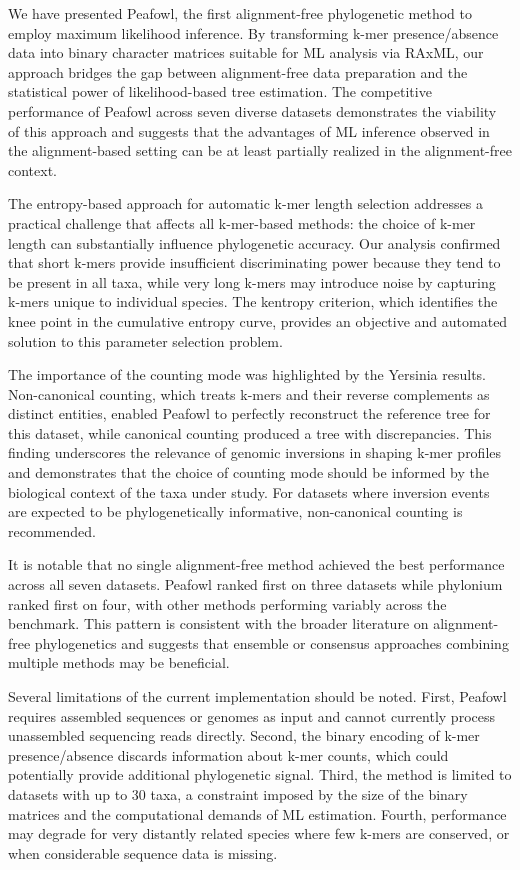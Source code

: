 \documentclass[12pt]{article}
\begin{document}
We have presented Peafowl, the first alignment-free phylogenetic method to employ maximum likelihood inference. By transforming k-mer presence/absence data into binary character matrices suitable for ML analysis via RAxML, our approach bridges the gap between alignment-free data preparation and the statistical power of likelihood-based tree estimation. The competitive performance of Peafowl across seven diverse datasets demonstrates the viability of this approach and suggests that the advantages of ML inference observed in the alignment-based setting can be at least partially realized in the alignment-free context.

The entropy-based approach for automatic k-mer length selection addresses a practical challenge that affects all k-mer-based methods: the choice of k-mer length can substantially influence phylogenetic accuracy. Our analysis confirmed that short k-mers provide insufficient discriminating power because they tend to be present in all taxa, while very long k-mers may introduce noise by capturing k-mers unique to individual species. The kentropy criterion, which identifies the knee point in the cumulative entropy curve, provides an objective and automated solution to this parameter selection problem.

The importance of the counting mode was highlighted by the Yersinia results. Non-canonical counting, which treats k-mers and their reverse complements as distinct entities, enabled Peafowl to perfectly reconstruct the reference tree for this dataset, while canonical counting produced a tree with discrepancies. This finding underscores the relevance of genomic inversions in shaping k-mer profiles and demonstrates that the choice of counting mode should be informed by the biological context of the taxa under study. For datasets where inversion events are expected to be phylogenetically informative, non-canonical counting is recommended.

It is notable that no single alignment-free method achieved the best performance across all seven datasets. Peafowl ranked first on three datasets while phylonium ranked first on four, with other methods performing variably across the benchmark. This pattern is consistent with the broader literature on alignment-free phylogenetics \citep{zielezinski2017} and suggests that ensemble or consensus approaches combining multiple methods may be beneficial.

Several limitations of the current implementation should be noted. First, Peafowl requires assembled sequences or genomes as input and cannot currently process unassembled sequencing reads directly. Second, the binary encoding of k-mer presence/absence discards information about k-mer counts, which could potentially provide additional phylogenetic signal. Third, the method is limited to datasets with up to 30 taxa, a constraint imposed by the size of the binary matrices and the computational demands of ML estimation. Fourth, performance may degrade for very distantly related species where few k-mers are conserved, or when considerable sequence data is missing.
\end{document}
